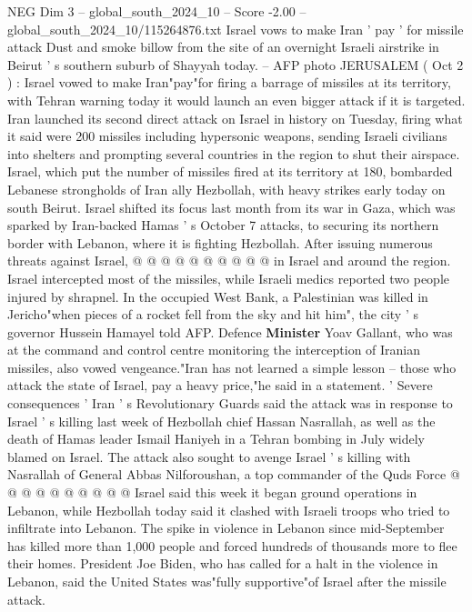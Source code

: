 \begin{textsample}{NEG Dim 3 – global\_south\_2024\_10 – Score -2.00 – global\_south\_2024\_10/115264876.txt}  \label{ex:f3_neg_091}
Israel vows to make Iran ' pay ' for missile attack Dust and smoke billow from the site of an overnight Israeli airstrike in Beirut ' s southern suburb of Shayyah today. -- AFP photo JERUSALEM ( Oct 2 ) : Israel vowed to make Iran"pay"for firing a barrage of missiles at its territory, with Tehran warning today it would launch an even bigger attack if it is targeted.
Iran launched its second direct attack on Israel in history on Tuesday, firing what it said were 200 missiles including hypersonic weapons, sending Israeli civilians into shelters and prompting several countries in the region to shut their airspace.
Israel, which put the number of missiles fired at its territory at 180, bombarded Lebanese strongholds of Iran ally Hezbollah, with heavy strikes early today on south Beirut.
Israel shifted its focus last month from its war in Gaza, which was sparked by Iran-backed Hamas ' s October 7 attacks, to securing its northern border with Lebanon, where it is fighting Hezbollah.
After issuing numerous threats against Israel, @ @ @ @ @ @ @ @ @ @ in Israel and around the region.
Israel intercepted most of the missiles, while Israeli medics reported two people injured by shrapnel.
In the occupied West Bank, a Palestinian was killed in Jericho"when pieces of a rocket fell from the sky and hit him", the city ' s governor Hussein Hamayel told AFP.
Defence \textbf{Minister} Yoav Gallant, who was at the command and control centre monitoring the interception of Iranian missiles, also vowed vengeance."Iran has not learned a simple lesson -- those who attack the state of Israel, pay a heavy price,"he said in a statement. ' Severe consequences ' Iran ' s Revolutionary Guards said the attack was in response to Israel ' s killing last week of Hezbollah chief Hassan Nasrallah, as well as the death of Hamas leader Ismail Haniyeh in a Tehran bombing in July widely blamed on Israel.
The attack also sought to avenge Israel ' s killing with Nasrallah of General Abbas Nilforoushan, a top commander of the Quds Force @ @ @ @ @ @ @ @ @ @ Israel said this week it began ground operations in Lebanon, while Hezbollah today said it clashed with Israeli troops who tried to infiltrate into Lebanon.
The spike in violence in Lebanon since mid-September has killed more than 1,000 people and forced hundreds of thousands more to flee their homes.
President Joe Biden, who has called for a halt in the violence in Lebanon, said the United States was"fully supportive"of Israel after the missile attack.

\end{textsample}
